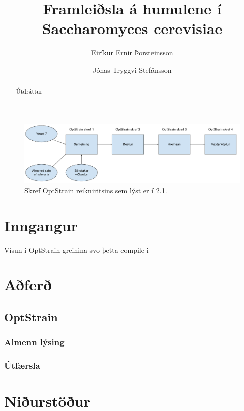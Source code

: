 \documentclass[12pt]{article}
\title{Framleiðsla á humulene í Saccharomyces cerevisiae}
\author{Eiríkur Ernir Þorsteinsson \and Jónas Tryggvi Stefánsson}
\begin{document}
\maketitle

\begin{abstract}
Útdráttur
\end{abstract}


\begin{figure}
\caption[OptStrain reikniritið]{Skref OptStrain reikniritsins sem lýst er í \ref{sec:optstrain}.}
\label{fig:flaedirit}
\includegraphics[width=\textwidth]{Pics/OptStrainOverview}
\end{figure}


\section{Inngangur}
Vísun í OptStrain-greinina svo þetta compile-i \cite{pharkya2004optstrain}

\section{Aðferð}
\subsection{OptStrain}
\label{sec:optstrain}
\subsubsection{Almenn lýsing}
\subsubsection{Útfærsla}

\section{Niðurstöður}
\end{document}
